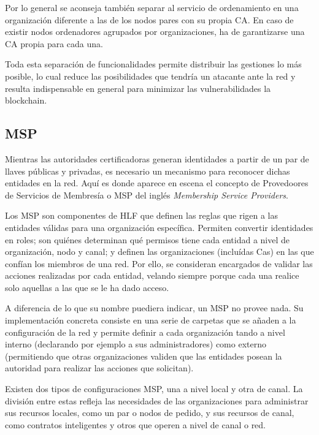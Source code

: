 Por lo general se aconseja tambi\'en separar al servicio de ordenamiento en una organizaci\'on diferente a las de los nodos pares con su propia CA. En caso de existir nodos ordenadores agrupados por organizaciones, ha de garantizarse una CA propia para cada una.

Toda esta separaci\'on de funcionalidades permite distribuir las gestiones lo m\'as posible, lo cual reduce las posibilidades que tendr\'ia un atacante ante la red y resulta indispensable en general para minimizar las vulnerabilidades la blockchain.


\subsection{MSP}
Mientras las autoridades certificadoras generan identidades a partir de un par de llaves p\'ublicas y privadas, es necesario un mecanismo para reconocer dichas entidades en la red. Aqu\'i es donde aparece en escena el concepto de Provedoores de Servicios de Membres\'ia o MSP del ingl\'es \emph{Membership Service Providers}.

Los MSP son componentes de HLF que definen las reglas que rigen a las entidades v\'alidas para una organizaci\'on espec\'ifica. Permiten convertir identidades en roles; son qui\'enes determinan qu\'e permisos tiene cada entidad a nivel de organizaci\'on, nodo y canal; y definen las organizaciones (inclu\'idas Cas) en las que conf\'ian los miembros de una red. Por ello, se consideran encargados de validar las acciones realizadas por cada entidad, velando siempre porque cada una realice solo aquellas a las que se le ha dado acceso.

A diferencia de lo que su nombre puediera indicar, un MSP no provee nada. Su implementaci\'on concreta consiste en una serie de carpetas que se a\~naden a la configuraci\'on de la red y permite definir a cada organizaci\'on tando a nivel interno (declarando por ejemplo a sus administradores) como externo (permitiendo que otras organizaciones validen que las entidades posean la autoridad para realizar las acciones que solicitan).

Existen dos tipos de configuraciones MSP, una a nivel local y otra de canal. La divisi\'on entre estas refleja las necesidades de las organizaciones para administrar sus recursos locales, como un par o nodos de pedido, y sus recursos de canal, como contratos inteligentes y otros que operen a nivel de canal o red.

